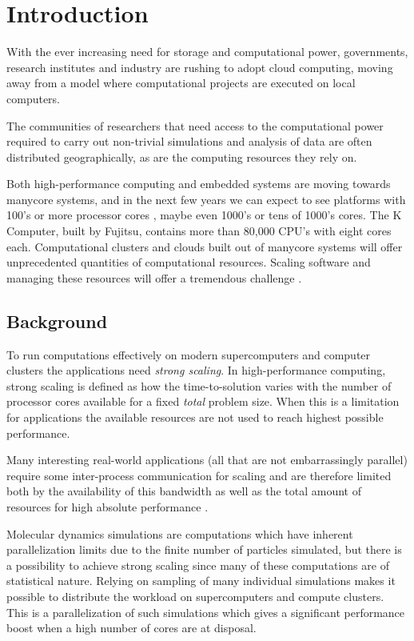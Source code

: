 \chapter{Introduction}
With the ever increasing need for storage and computational power,
governments, research institutes and industry are rushing to adopt
cloud computing, moving away from a model where computational projects
are executed on local computers.

The communities of researchers that need access to the computational
power required to carry out non-trivial simulations and analysis of
data are often distributed geographically, as are the computing
resources they rely on.

Both high-performance computing and embedded systems are moving
towards manycore systems, and in the next few years we can expect to
see platforms with 100's or more processor cores \citep{leupers:2011},
maybe even 1000's or tens of 1000's cores. The K Computer, built by
Fujitsu, contains more than 80,000 CPU's with eight cores
each. Computational clusters and clouds built out of manycore systems
will offer unprecedented quantities of computational
resources. Scaling software and managing these resources will offer a
tremendous challenge \citep{csail:2009}.


\section{Background}
To run computations effectively on modern supercomputers and computer
clusters the applications need \emph{strong scaling}. In
high-performance computing, strong scaling is defined as how the time-to-solution
varies with the number of processor cores available for a fixed
\emph{total} problem size. When this is a limitation for applications
the available resources are not used to reach highest possible
performance.

Many interesting real-world applications (all that are not
embarrassingly parallel) require some inter-process communication for
scaling and are therefore limited both by the availability of this
bandwidth as well as the total amount of resources for high absolute
performance \citep{pronk:2011}.

Molecular dynamics simulations are computations which have inherent
parallelization limits due to the finite number of particles
simulated, but there is a possibility to achieve strong scaling since
many of these computations are of statistical nature. Relying on
sampling of many individual simulations makes it possible to
distribute the workload on supercomputers and compute clusters. This
is a parallelization of such simulations which gives a significant
performance boost when a high number of cores are at disposal.

